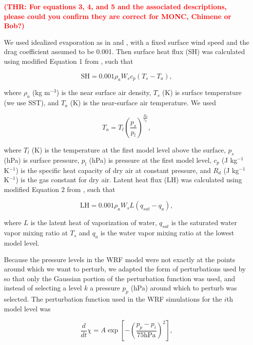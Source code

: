 \documentclass[draft]{agujournal2019}
\newcommand{\todo}[1]{\textcolor{red}{\textbf{(#1)}}}
\begin{document}
\todo{THR: For equations 3, 4, and 5 and the associated descriptions, please
could you confirm they are correct for MONC, Chimene or Bob?}

We used idealized evaporation as in  and
, with a fixed surface wind speed and the drag
coefficient assumed to be 0.001. Then surface heat flux (SH) was calculated
using modified Equation 1 from , such that

\begin{equation}
\textrm{SH} = 0.001 \rho_a W_s c_p (T_s - T_a),
\end{equation}

\noindent where $\rho_a$ (kg m$^{-3}$) is the near surface air density, $T_s$
(K) is surface temperature (we use SST), and $T_a$ (K) is the near-surface air
temperature. We used 

\begin{equation}
T_a = T_l \left(\frac{p_s}{p_l}\right)^{\frac{R_d}{c_p}},
\end{equation}

\noindent where $T_l$ (K) is the temperature at the first model level above the
surface, $p_s$ (hPa) is surface pressure, $p_l$ (hPa) is pressure at the first
model level, $c_p$ (J kg$^{-1}$ K$^{-1}$) is the specific heat capacity of dry
air at constant pressure, and $R_d$ (J kg$^{-1}$ K$^{-1}$) is the gas constant
for dry air. Latent heat flux (LH) was calculated using modified Equation 2 from
, such that

\begin{equation}
\textrm{LH} = 0.001 \rho_a W_s L (q_{sat} - q_a),
\label{eq:LH}
\end{equation}

\noindent where $L$ is the latent heat of vaporization of water, $q_{sat}$ is
the saturated water vapor mixing ratio at $T_s$ and $q_a$ is the water vapor
mixing ratio at the lowest model level. 

Because the pressure levels in the WRF model were not exactly at the points
around which we want to perturb, we adapted the form of perturbations used by
 so that only the Gaussian portion of the perturbation
function was used, and instead of selecting a level $k$ a pressure $p_p$ (hPa)
around which to perturb was selected. The perturbation function used in the WRF
simulations for the $i$th model level was

\begin{equation}
\frac{d}{dt} \chi = A \exp\left[ - \left( \frac{p_p - p_i}{75 \textrm{hPa}}\right)^2 \right],
\end{equation}
\end{document}
